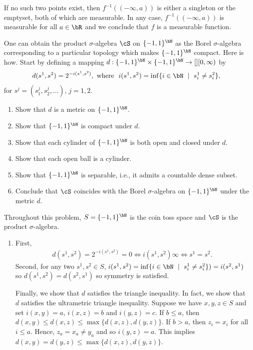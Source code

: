 \begin{homework}[e]
\begin{prf}
		If no such two points exist, then $f^{-1}((-\infty,a))$ is either a singleton or the emptyset, both of which are measurable. In any case, $f^{-1}((-\infty,a))$ is measurable for all $a \in \bR$ and we conclude that $f$ is a measurable function.
	\end{prf}
	\prob One can obtain the product $\sigma$-algebra $\cS$ on $\{-1,1\}^\bN$ as the Borel $\sigma$-algebra corresponding to a particular topology which makes $\{-1,1\}^\bN$ compact. Here is how. Start by defining a mapping $d:\{-1,1\}^\bN \times \{-1,1\}^\bN \to[] [0,\infty)$ by
	\begin{align*}
		d(s^1,s^2) = 2^{-i(s^1,s^2)}, ~ \text{where }~ i(s^1,s^2) = \inf \{i \in \bN ~\mid~ s_i^1 \neq s_i^2\},
	\end{align*}
	for $s^j = (s^j_1,s^j_2,...)$, $j=1,2.$
	\begin{enumerate}[(1)]
		\item Show that $d$ is a metric on $\{-1,1\}^\bN$.
		\item Show that $\{-1,1\}^\bN$ is compact under $d.$
		\item Show that each cylinder of $\{-1,1\}^\bN$ is both open and closed under $d$.
		\item Show that each open ball is a cylinder.
		\item Show that $\{-1,1\}^\bN$ is separable, i.e., it admits a countable dense subset.
		\item Conclude that $\cS$ coincides with the Borel $\sigma$-algebra on $\{-1,1\}^\bN$ under the metric $d$.
	\end{enumerate}
	\begin{prf}
		Throughout this problem, $S = \{-1,1\}^\bN$ is the coin toss space and $\cS$ is the product $\sigma$-algebra.
		\begin{enumerate}[(1)]
			\item First,
				\begin{align*}
					d(s^1,s^2) = 2^{-i(s^1,s^2)} = 0 \iff i(s^1,s^2) \infty \iff s^1 = s^2.
				\end{align*}
				Second, for any two $s^1,s^2 \in S$, $i(s^1,s^2) = \inf\{i \in \bN ~\mid~ s_i^1 \neq s^2_i\}) = i(s^2,s^1)$ so $d(s^1,s^2) = d(s^2,s^1)$ so symmetry is satisfied.

				Finally, we show that $d$ satisfies the triangle inequality. In fact, we show that $d$ satisfies the ultrametric triangle inequality. Suppose we have $x,y,z \in S$ and set $i(x,y) = a$, $i(x,z) = b$ and $i(y,z) = c$. If $b \leq a$, then $d(x,y) \leq d(x,z) \leq \max\{d(x,z),d(y,z)\}$. If $b > a$, then $z_i = x_i$ for all $i \leq a$. Hence, $z_a = x_a \neq y_a$ and so $i(y,z) = a$. This implies $d(x,y) = d(y,z) \leq \max\{d(x,z),d(y,z)\}$.


\end{enumerate}
\end{prf}
\end{homework}
